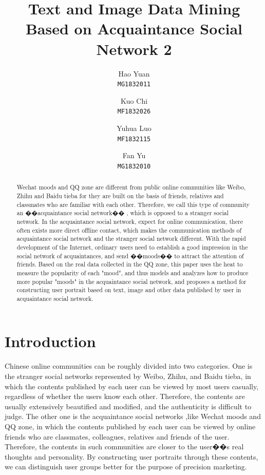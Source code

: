 \documentclass[10pt,twocolumn,letterpaper]{article}
\begin{document}
\title{Text and Image Data Mining Based on Acquaintance Social Network 2}

\author{Hao Yuan\\
{\tt\small MG1832011}
\and Kuo Chi\\
{\tt\small MF1832026}
\and Yuhua Luo\\
{\tt\small MF1832115}
\and Fan Yu\\
{\tt\small MG1832010}}

\maketitle

\begin{abstract}
    Wechat moods and QQ zone are different from public online communities like Weibo, Zhihu and Baidu tieba for they are built on the basis of friends, relatives and classmates who are familiar with each other.
    Therefore, we call this type of community an ��acquaintance social network�� , which is opposed to a stranger social network.
    In the acquaintance social network, expect for online communication, there often exists more direct offline contact, which makes the communication methods of acquaintance social network and the stranger social network different.
    With the rapid development of the Internet, ordinary users need to establish a good impression in the social network of acquaintances, and send ��moods�� to attract the attention of friends.
    Based on the real data collected in the QQ zone, this paper uses the heat to measure the popularity of each "mood", and thus models and analyzes how to produce more popular "moods" in the acquaintance social network, and proposes a method for constructing user portrait based on text, image and other data published by user in acquaintance social network.


\end{abstract}

\section{Introduction}
    Chinese online communities can be roughly divided into two categories.
    One is the stranger social networks represented by Weibo, Zhihu, and Baidu tieba, in which the contents published by each user can be viewed by most users casually, regardless of whether the users know each other.
    Therefore, the contents are usually extensively beautified and modified, and the authenticity is difficult to judge.
    The other one is the acquaintance social networks ,like Wechat moods and QQ zone, in which the contents published by each user can be viewed by online friends who are classmates, colleagues, relatives and friends of the user.
    Therefore, the contents in such communities are closer to the user��s real thoughts and personality.
    By constructing user portraits through these contents, we can distinguish user groups better for the purpose of precision marketing.
\end{document}
